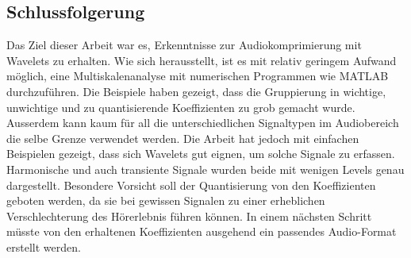 \begin{refsection}
\section{Schlussfolgerung}
Das Ziel dieser Arbeit war es, Erkenntnisse zur Audiokomprimierung mit Wavelets zu erhalten.
Wie sich herausstellt, ist es mit relativ geringem Aufwand möglich, eine Multiskalenanalyse mit numerischen Programmen wie MATLAB durchzuführen.
Die Beispiele haben gezeigt, dass die Gruppierung in wichtige, unwichtige und zu quantisierende Koeffizienten zu grob gemacht wurde. 
Ausserdem kann kaum für all die unterschiedlichen Signaltypen im Audiobereich die selbe Grenze verwendet werden. 
Die Arbeit hat jedoch mit einfachen Beispielen gezeigt, dass sich Wavelets gut eignen, um solche Signale zu erfassen.
Harmonische und auch transiente Signale wurden beide mit wenigen Levels genau dargestellt.
Besondere Vorsicht soll der Quantisierung von den Koeffizienten geboten werden, da sie bei gewissen Signalen zu einer erheblichen Verschlechterung des Hörerlebnis führen können.
In einem nächsten Schritt müsste von den erhaltenen Koeffizienten ausgehend ein passendes Audio-Format erstellt werden.

\printbibliography[heading=subbibliography]
\end{refsection}
